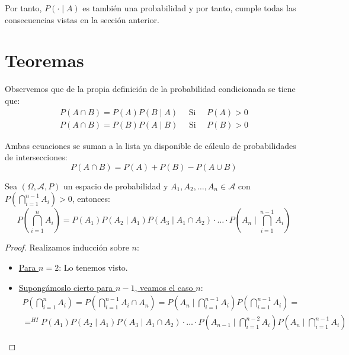 Por tanto, $P(\cdot \mid A)$ es también una probabilidad y por tanto, cumple todas las consecuencias vistas en la sección anterior.

\section{Teoremas}

Observemos que de la propia definición de la probabilidad condicionada se tiene que:
\begin{gather*}
    P(A \cap B) = P(A) P(B \mid A) \quad \text{ Si } \quad P(A) > 0 \\
    P(A \cap B) = P(B) P(A \mid B) \quad \text{ Si } \quad P(B) > 0
\end{gather*}

Ambas ecuaciones se suman a la lista ya disponible de cálculo de probabilidades de intersecciones:
$$P(A \cap B) = P(A) + P(B) - P(A \cup B)$$

\begin{teo}
    Sea $(\Omega, \mathcal{A}, P)$ un espacio de probabilidad y $A_1, A_2, \ldots, A_n \in \mathcal{A}$ con 
    $P\left( \bigcap\limits_{i=1}^{n-1} A_i \right) > 0$, entonces:
    $$
    P\left( \bigcap_{i=1}^n A_i \right)
    = P(A_1) P(A_2 \mid A_1) P(A_3 \mid A_1 \cap A_2) \cdot \ldots \cdot
    P\left( A_n \mid \bigcap_{i=1}^{n-1} A_i \right)
    $$
\end{teo}
\begin{proof}
  Realizamos inducción sobre $n$:
  \begin{itemize}
      \item \underline{Para $n=2$}: Lo tenemos visto.

      \item \underline{Supongámoslo cierto para $n-1$, veamos el caso $n$}:
      \begin{multline*}
          P\left( \bigcap_{i=1}^n A_i \right) 
          = P\left( \bigcap_{i=1}^{n-1} A_i \cap A_n \right)
          = P\left( A_n \mid \bigcap_{i=1}^{n-1} A_i \right) P\left( \bigcap_{i=1}^{n-1} A_i \right) =\\
          \mathop{=}^{HI} P(A_1) P(A_2 \mid A_1) P(A_3 \mid A_1 \cap A_2) \cdot \ldots \cdot P\left( A_{n-1} \mid \bigcap_{i=1}^{n-2} A_i \right) P\left( A_n \mid \bigcap_{i=1}^{n-1} A_i \right)
      \end{multline*}
  \end{itemize}
\end{proof}

